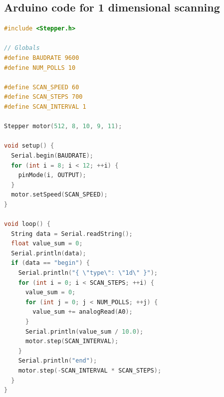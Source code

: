 \documentclass[letterpaper, 12pt]{article}
\begin{document}
\subsection{Arduino code for 1 dimensional scanning}
\begin{lstlisting}[language=C]
#include <Stepper.h>

// Globals
#define BAUDRATE 9600
#define NUM_POLLS 10

#define SCAN_SPEED 60
#define SCAN_STEPS 700
#define SCAN_INTERVAL 1

Stepper motor(512, 8, 10, 9, 11);

void setup() {
  Serial.begin(BAUDRATE);
  for (int i = 8; i < 12; ++i) {
    pinMode(i, OUTPUT);
  }
  motor.setSpeed(SCAN_SPEED);
}

void loop() {
  String data = Serial.readString();
  float value_sum = 0;
  Serial.println(data);
  if (data == "begin") {
    Serial.println("{ \"type\": \"1d\" }");
    for (int i = 0; i < SCAN_STEPS; ++i) {
      value_sum = 0;
      for (int j = 0; j < NUM_POLLS; ++j) {
        value_sum += analogRead(A0);
      }
      Serial.println(value_sum / 10.0);
      motor.step(SCAN_INTERVAL);
    }
    Serial.println("end");
    motor.step(-SCAN_INTERVAL * SCAN_STEPS);
  }
}
\end{lstlisting}
\end{document}
